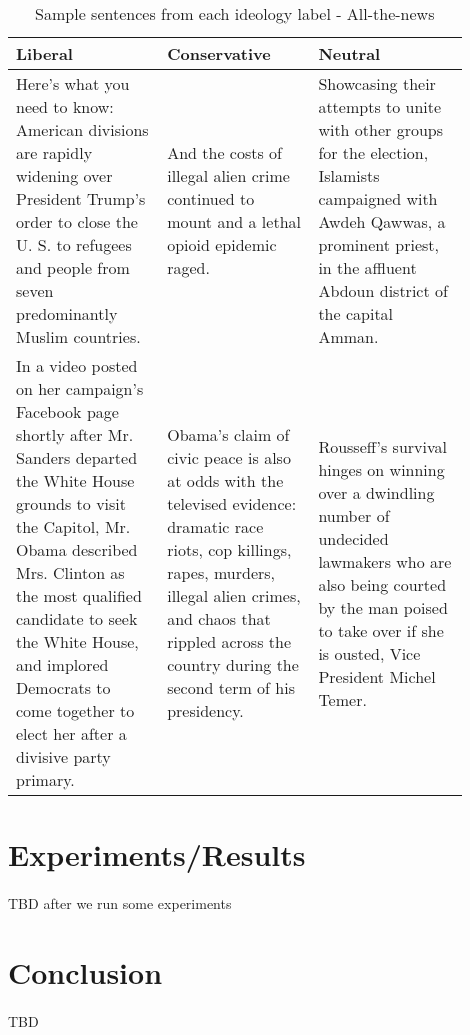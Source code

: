 \documentclass[10pt,a4paper,onecolumn]{article}
\begin{document}
\begin{table}[h!]
	\begin{center}
		\caption{Sample sentences from each ideology label - All-the-news	}
		\label{tab:atn-sentences}
		\begin{tabular}{p{0.3\linewidth}|p{0.3\linewidth}|p{0.3\linewidth}}
			\hline\hline
			\textbf{Liberal} & \textbf{Conservative} & \textbf{Neutral}\\
			\hline
			Here’s what you need to know: American divisions are rapidly widening over President Trump’s order to close the U. S. to refugees and people from seven predominantly Muslim countries. & And the costs of illegal alien crime continued to mount and a lethal opioid epidemic raged. & Showcasing their attempts to unite with other groups for the election, Islamists campaigned with Awdeh Qawwas, a prominent priest, in the affluent Abdoun district of the capital Amman. \\
			In a video posted on her campaign’s Facebook page shortly after Mr. Sanders departed the White House grounds to visit the Capitol, Mr. Obama described Mrs. Clinton as the most qualified candidate to seek the White House, and implored Democrats to come together to elect her after a divisive party primary. & Obama’s claim of civic peace is also at odds with the televised evidence: dramatic race riots, cop killings, rapes, murders, illegal alien crimes, and chaos that rippled across the country during the second term of his presidency. & Rousseff’s survival hinges on winning over a dwindling number of undecided lawmakers who are also being courted by the man poised to take over if she is ousted, Vice President Michel Temer. \\
			\hline\hline
		\end{tabular}
	\end{center}
\end{table}

\section{Experiments/Results}
\paragraph{}
TBD after we run some experiments

\section{Conclusion}
\paragraph{}
TBD
\end{document}
